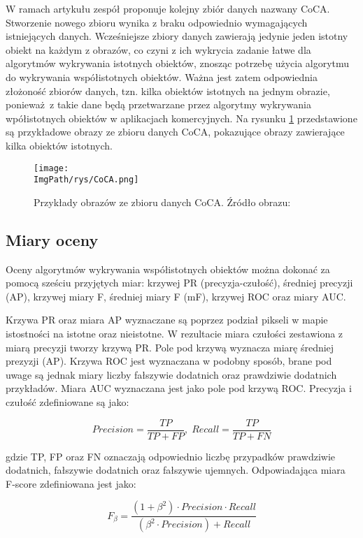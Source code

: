 \documentclass[a4paper,12pt,twoside,openany]{report}
\newcommand{\ImgPath}{.}
\begin{document}
	W ramach artykułu \cite{zhang2020gradientinduced} zespół proponuje kolejny zbiór danych nazwany CoCA. Stworzenie nowego zbioru wynika z braku odpowiednio wymagających istniejących danych. Wcześniejsze zbiory danych zawierają jedynie jeden istotny obiekt na każdym z obrazów, co czyni z ich wykrycia zadanie łatwe dla algorytmów wykrywania istotnych obiektów, znosząc potrzebę użycia algorytmu do wykrywania współistotnych obiektów. Ważna jest zatem odpowiednia złożoność zbiorów danych, tzn. kilka obiektów istotnych na jednym obrazie, ponieważ z takie dane będą przetwarzane przez algorytmy wykrywania wpółistotnych obiektów w aplikacjach komercyjnych. Na rysunku \ref{CoCA} przedstawione są przykładowe obrazy ze zbioru danych CoCA, pokazujące obrazy zawierające kilka obiektów istotnych. 

	\begin{figure}[h]
		\centering
		\texttt{[image: \\ImgPath/rys/CoCA.png]}
		\caption{Przykłady obrazów ze zbioru danych CoCA. Źródło obrazu: \cite{zhang2020gradientinduced}}
		\label{CoCA}
	\end{figure}


	\subsection{Miary oceny}
	Oceny algorytmów wykrywania współistotnych obiektów można dokonać za pomocą sześciu przyjętych miar: krzywej PR (precyzja-czułość), średniej precyzji (AP), krzywej miary F, średniej miary F (mF), krzywej ROC oraz miary AUC. 

	Krzywa PR oraz miara AP wyznaczane są poprzez podział pikseli w mapie istostności na istotne oraz nieistotne. W rezultacie miara czułości zestawiona z miarą precyzji tworzy krzywą PR. Pole pod krzywą wyznacza miarę średniej prezyzji (AP). Krzywa ROC jest wyznaczana w podobny sposób, brane pod uwage są jednak miary liczby fałszywie dodatnich oraz prawdziwie dodatnich przykładów. Miara AUC wyznaczana jest jako pole pod krzywą ROC. Precyzja i czułość zdefiniowane są jako:

	\begin{equation}
		Precision = \frac{TP}{TP + FP}, \; Recall = \frac{TP}{TP + FN}
	\end{equation}

	gdzie TP, FP oraz FN oznaczają odpowiednio liczbę przypadków prawdziwie dodatnich, fałszywie dodatnich oraz fałszywie ujemnych. Odpowiadająca miara F-score zdefiniowana jest jako:

	\begin{equation}
		F_{\beta} = \frac{(1 + \beta^2)\cdot Precision \cdot Recall}{(\beta^2 \cdot Precision) + Recall}
	\end{equation}
\end{document}
